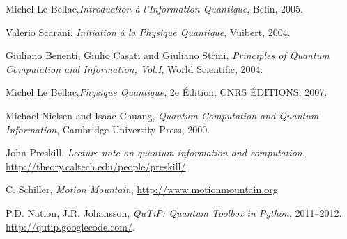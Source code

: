\documentclass[12pt,a4paper,oneside,openany]{book}%
\numberwithin{equation}{section}
\numberwithin{figure}{section}
\numberwithin{table}{section}
\begin{document}
\appendix









% 
\backmatter


\begin{thebibliography}{99999999}

Michel Le Bellac,\emph{Introduction à l'Information
Quantique}, Belin, 2005.

Valerio Scarani, \emph{Initiation à la Physique
Quantique}, Vuibert, 2004.

Giuliano Benenti, Giulio Casati and Giuliano Strini,
\emph{Principles of Quantum Computation and Information, Vol.I}, World
Scientific, 2004.

Michel Le Bellac,\emph{Physique Quantique}, 2e
Édition, CNRS ÉDITIONS, 2007.

Michael Nielsen and Isaac Chuang, \emph{Quantum
Computation and Quantum Information}, Cambridge University Press, 2000.

John Preskill, \emph{Lecture note on quantum
information and computation}, \url{http://theory.caltech.edu/people/preskill/}.

C. Schiller, \emph{Motion Mountain},
\url{http://www.motionmountain.org}

P.D. Nation, J.R. Johansson, \emph{QuTiP: Quantum 
Toolbox in Python}, 2011–2012. \url{http://qutip.googlecode.com/}.

\end{thebibliography}
\end{document}
